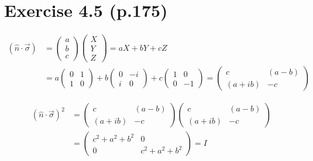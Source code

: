 \documentclass[12pt]{article}
\begin{document}
\section{Exercise 4.5 (p.175)}

\begin{equation*}
\begin{aligned}
(\hat{n} \cdot \vec{\sigma}) 
&= 
\begin{pmatrix} a \\ b \\ c \end{pmatrix}
\begin{pmatrix} X \\ Y \\ Z \end{pmatrix}
= aX + bY + cZ \\
&= a
\begin{pmatrix}
0 & 1 \\ 
1 & 0 
\end{pmatrix}
+ b
\begin{pmatrix}
0 & -i \\ 
i & 0 
\end{pmatrix}
+ c
\begin{pmatrix}
1 & 0 \\ 
0 & -1 
\end{pmatrix}
=
\begin{pmatrix}
c & (a-b) \\ 
(a+ib) & -c 
\end{pmatrix}
\end{aligned}
\end{equation*}

\begin{equation*}
\begin{aligned}
(\hat{n} \cdot \vec{\sigma})^2
&= 
\begin{pmatrix}
c & (a-b) \\ 
(a+ib) & -c 
\end{pmatrix}
\begin{pmatrix}
c & (a-b) \\ 
(a+ib) & -c 
\end{pmatrix} \\
&=
\begin{pmatrix}
c^2 + a^2 + b^2 & 0 \\ 
0 & c^2 + a^2 + b^2
\end{pmatrix}
= I
\end{aligned}
\end{equation*}
\end{document}
